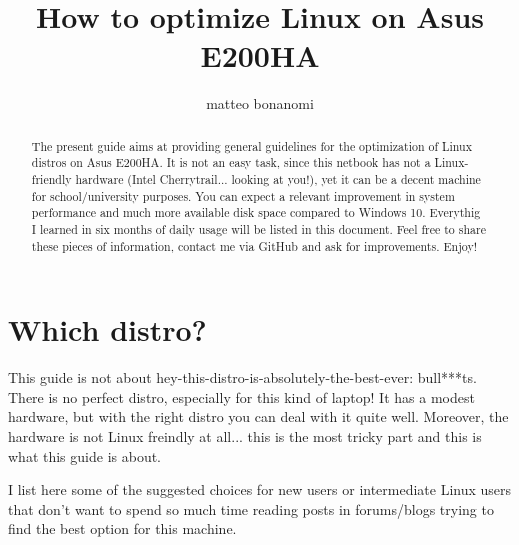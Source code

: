 \documentclass{article}
\begin{document}
\title{How to optimize Linux on Asus E200HA}
\author{matteo bonanomi}


\maketitle

\begin{abstract}
The present guide aims at providing general guidelines for the optimization of Linux distros on Asus E200HA. It is not an easy task, since this netbook has not a Linux-friendly hardware (Intel Cherrytrail... looking at you!), yet it can be a decent machine for school/university purposes. You can expect a relevant improvement in system performance and much more available disk space compared to Windows 10. Everythig I learned in six months of daily usage will be listed in this document. Feel free to share these pieces of information, contact me via GitHub and ask for improvements. Enjoy!  
\end{abstract}

\tableofcontents

\newpage


\section{Which distro?}
This guide is not about hey-this-distro-is-absolutely-the-best-ever: bull***ts. There is no perfect distro, especially for this kind of laptop! It has a modest hardware, but with the right distro you can deal with it quite well. Moreover, the hardware is not Linux freindly at all... this is the most tricky part and this is what this guide is about. 

I list here some of the suggested choices for new users or intermediate Linux users that don't want to spend so much time reading posts in forums/blogs trying to find the best option for this machine. 
\end{document}
